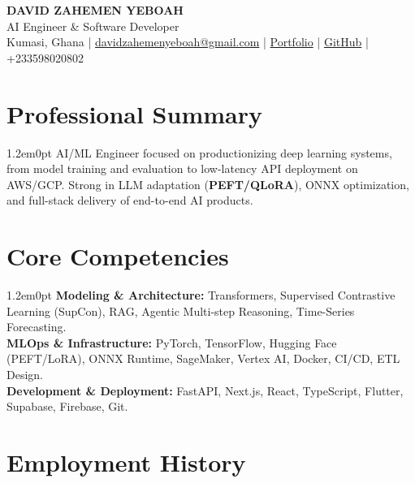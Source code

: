 \documentclass[a4paper,9pt]{extarticle}
\newenvironment{subs}
  {\begin{adjustwidth}{1.2em}{0pt}}
  {\end{adjustwidth}}
\begin{document}
\pagestyle{empty}
\color{primary}

\begin{center}
    \textbf{\huge DAVID ZAHEMEN YEBOAH}\\[6pt]
    \small AI Engineer \& Software Developer\\[4pt]
    \small Kumasi, Ghana | \href{mailto:davidzahemenyeboah@gmail.com}{davidzahemenyeboah@gmail.com} | \href{https://david-z-yeboah.vercel.app}{Portfolio} | \href{https://github.com/zahemen9900}{GitHub} | +233598020802
\end{center}

\section*{Professional Summary}
\begin{subs}
AI/ML Engineer focused on productionizing deep learning systems, from model training and evaluation to low-latency API deployment on AWS/GCP. Strong in LLM adaptation (\textbf{PEFT/QLoRA}), ONNX optimization, and full-stack delivery of end-to-end AI products.
\end{subs}

\section*{Core Competencies}
\begin{subs}
    \textbf{Modeling \& Architecture:} Transformers, Supervised Contrastive Learning (SupCon), RAG, Agentic Multi-step Reasoning, Time-Series Forecasting.\\
    \textbf{MLOps \& Infrastructure:} PyTorch, TensorFlow, Hugging Face (PEFT/LoRA), ONNX Runtime, SageMaker, Vertex AI, Docker, CI/CD, ETL Design.\\
    \textbf{Development \& Deployment:} FastAPI, Next.js, React, TypeScript, Flutter, Supabase, Firebase, Git.
\end{subs}

\section*{Employment History}
\end{document}
